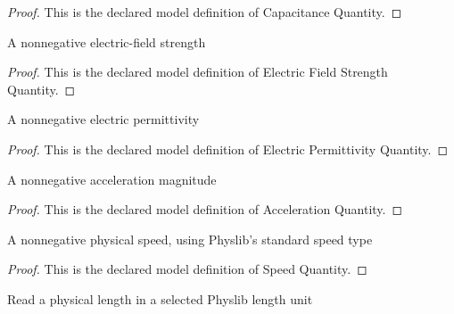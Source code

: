 \begin{proof}
  This is the declared model definition of Capacitance Quantity.
\end{proof}
\begin{definition}
  \label{def:physics:phyx-mini-0908:phyxminiproblems-problemphyxmini0908-electricfieldstrengthquantity}
  A nonnegative electric-field strength
\end{definition}
\begin{proof}
  This is the declared model definition of Electric Field Strength Quantity.
\end{proof}
\begin{definition}
  \label{def:physics:phyx-mini-0908:phyxminiproblems-problemphyxmini0908-electricpermittivityquantity}
  A nonnegative electric permittivity
\end{definition}
\begin{proof}
  This is the declared model definition of Electric Permittivity Quantity.
\end{proof}
\begin{definition}
  \label{def:physics:phyx-mini-0908:phyxminiproblems-problemphyxmini0908-accelerationquantity}
  A nonnegative acceleration magnitude
\end{definition}
\begin{proof}
  This is the declared model definition of Acceleration Quantity.
\end{proof}
\begin{definition}
  \label{def:physics:phyx-mini-0908:phyxminiproblems-problemphyxmini0908-speedquantity}
  A nonnegative physical speed, using Physlib's standard speed type
\end{definition}
\begin{proof}
  This is the declared model definition of Speed Quantity.
\end{proof}
\begin{definition}
  \label{def:physics:phyx-mini-0908:phyxminiproblems-problemphyxmini0908-lengthreadout}
  Read a physical length in a selected Physlib length unit
\end{definition}
